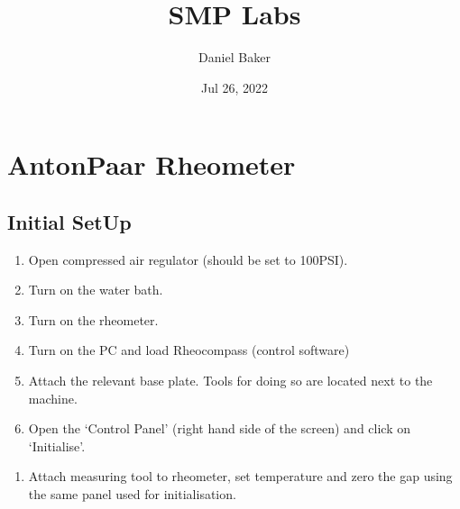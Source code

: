 \documentclass[letterpaper,10pt,english]{sphinxmanual}
\title{SMP Labs}
\date{Jul 26, 2022}
\author{Daniel Baker}
\begin{document}
\pagestyle{empty}
\sphinxmaketitle
\pagestyle{plain}
\sphinxtableofcontents
\pagestyle{normal}
\label{\detokenize{index::doc}}



\chapter{Anton\sphinxhyphen{}Paar Rheometer}
\label{\detokenize{anton-paar:anton-paar-rheometer}}\label{\detokenize{anton-paar::doc}}

\section{Initial Set\sphinxhyphen{}Up}
\label{\detokenize{anton-paar:initial-set-up}}\begin{enumerate}
%
\item {} 
\sphinxAtStartPar
Open compressed air regulator (should be set to 100PSI).

\item {} 
\sphinxAtStartPar
Turn on the water bath.

\item {} 
\sphinxAtStartPar
Turn on the rheometer.

\item {} 
\sphinxAtStartPar
Turn on the PC and load Rheocompass (control software)

\item {} 
\sphinxAtStartPar
Attach the relevant base plate. Tools for doing so are located next to the machine.

\item {} 
\sphinxAtStartPar
Open the ‘Control Panel’ (right hand side of the screen) and click on ‘Initialise’.

\end{enumerate}

\noindent{}
\begin{enumerate}
%
\setcounter{enumi}{6}
\item {} 
\sphinxAtStartPar
Attach measuring tool to rheometer, set temperature and zero the gap using the same panel used for initialisation.

\end{enumerate}

\noindent{}
\end{document}
